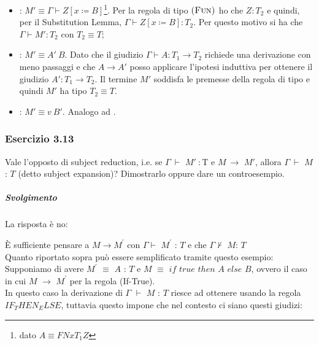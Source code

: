 \begin{description}
  \begin{itemize}
    \item {}: $M' \equiv{} \Gamma \vdash{}
      Z[x \coloneqq{} B]$\footnote{dato $A \equiv{} FN{x}{T_1}Z$}.
      Per la regola di tipo $\textsc{(Fun)}$ ho che $Z : T_2$ e quindi, per
       il Substitution Lemma, $\Gamma \vdash{} Z[x \coloneqq{} B] : T_2$. Per
      questo motivo si ha che $\Gamma \vdash{} M' : T_2$ con $T_2 \equiv T$;
    \item {}: $M' \equiv{} A'\: B$. Dato che il giudizio $\Gamma \vdash A : T_1 \to T_2$ richiede una derivazione con meno passaggi e che $A \to A'$ posso applicare l'ipotesi induttiva per ottenere il giudizio $A' : T_1 \to T_2$. Il termine $M'$ soddisfa le premesse della regola di tipo  e quindi $M'$ ha tipo $T_2 \equiv T$.

    \item {}: $M' \equiv{} v\: B'$. Analogo ad .
  \end{itemize}

 
\end{description}




\subsubsection*{Esercizio 3.13}

Vale l'opposto di subject reduction, i.e. se $\Gamma\:\vdash$ $M'\: :  $T e $M\:\rightarrow$ $M'$, allora $\Gamma\:\vdash$ $M$ : $T$ (detto subject expansion)? Dimostrarlo oppure dare un controesempio.
\subparagraph*{Svolgimento}
La risposta \`e no:

\`E sufficiente pensare a $M \rightarrow M^{\prime}$ con $\Gamma\vdash$ $M^{\prime}$ : $T$ e che 
$\Gamma\nvdash$ $M$: $T$\\
Quanto riportato sopra pu\`o essere semplificato tramite questo esempio:\\

Supponiamo di avere $M^{\prime}$ $\equiv$ $A$ : $T$ e $M$ $\equiv$ $if$ $true$ $then$ $A$ $else$ $B$, ovvero il caso in cui $M$ $\rightarrow$ $M^{\prime}$ per la regola (If-True).\\
In questo caso la derivazione di $\Gamma$ $\vdash$ $M$ : $T$ riesce ad ottenere usando la regola $IF_THEN_ELSE$, tuttavia questo impone che nel contesto ci siano questi giudizi:

